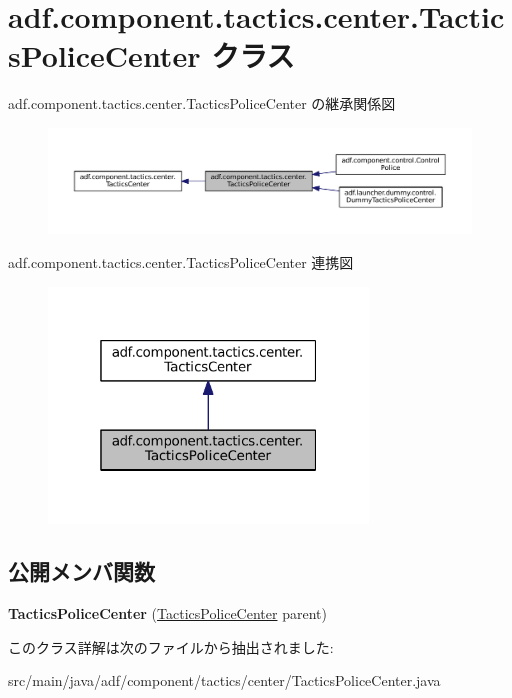 \hypertarget{classadf_1_1component_1_1tactics_1_1center_1_1TacticsPoliceCenter}{}\section{adf.\+component.\+tactics.\+center.\+Tactics\+Police\+Center クラス}
\label{classadf_1_1component_1_1tactics_1_1center_1_1TacticsPoliceCenter}


adf.\+component.\+tactics.\+center.\+Tactics\+Police\+Center の継承関係図
\nopagebreak
\begin{figure}[H]
\begin{center}
\leavevmode
\includegraphics[width=350pt]{classadf_1_1component_1_1tactics_1_1center_1_1TacticsPoliceCenter__inherit__graph}
\end{center}
\end{figure}


adf.\+component.\+tactics.\+center.\+Tactics\+Police\+Center 連携図
\nopagebreak
\begin{figure}[H]
\begin{center}
\leavevmode
\includegraphics[width=241pt]{classadf_1_1component_1_1tactics_1_1center_1_1TacticsPoliceCenter__coll__graph}
\end{center}
\end{figure}
\subsection*{公開メンバ関数}
\begin{DoxyCompactItemize}
\item 
\hypertarget{classadf_1_1component_1_1tactics_1_1center_1_1TacticsPoliceCenter_a09213a4445d7dd3d5484c558e7e8b2a3}{}\label{classadf_1_1component_1_1tactics_1_1center_1_1TacticsPoliceCenter_a09213a4445d7dd3d5484c558e7e8b2a3} 
{\bfseries Tactics\+Police\+Center} (\hyperlink{classadf_1_1component_1_1tactics_1_1center_1_1TacticsPoliceCenter}{Tactics\+Police\+Center} parent)
\end{DoxyCompactItemize}


このクラス詳解は次のファイルから抽出されました\+:\begin{DoxyCompactItemize}
\item 
src/main/java/adf/component/tactics/center/Tactics\+Police\+Center.\+java\end{DoxyCompactItemize}

